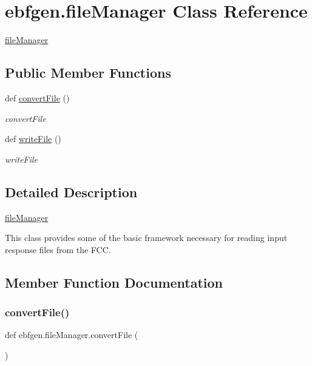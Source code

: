 \hypertarget{classebfgen_1_1fileManager}{}\section{ebfgen.\+file\+Manager Class Reference}
\label{classebfgen_1_1fileManager}


\hyperlink{classebfgen_1_1fileManager}{file\+Manager}  


\subsection*{Public Member Functions}
\begin{DoxyCompactItemize}
\item 
def \hyperlink{classebfgen_1_1fileManager_af064d8dc16d40d0a117053cb4e2a8ff1}{convert\+File} ()
\begin{DoxyCompactList}\small\item\em convert\+File \end{DoxyCompactList}\item 
def \hyperlink{classebfgen_1_1fileManager_a1d063fa4bd6093f44dd0d1151baa92bc}{write\+File} ()
\begin{DoxyCompactList}\small\item\em write\+File \end{DoxyCompactList}\end{DoxyCompactItemize}


\subsection{Detailed Description}
\hyperlink{classebfgen_1_1fileManager}{file\+Manager} 

This class provides some of the basic framework necessary for reading input response files from the F\+CC. 

\subsection{Member Function Documentation}
\mbox{\label{classebfgen_1_1fileManager_af064d8dc16d40d0a117053cb4e2a8ff1}} 
\subsubsection{\texorpdfstring{convert\+File()}{convertFile()}}
{\footnotesize\ttfamily def ebfgen.\+file\+Manager.\+convert\+File (\begin{DoxyParamCaption}{ }\end{DoxyParamCaption})}



